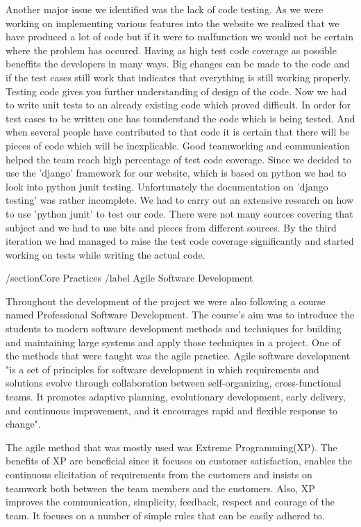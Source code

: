 \documentclass{l3proj}
\begin{document}
Another major issue we identified was the lack of code testing. As we were working on implementing various features into the website 
we realized that we have produced a lot of code but if it were to malfunction we would not be certain where the problem has occured.
Having as high test code coverage as possible beneffits the developers in many ways. Big changes can be made to the code and if 
the test cases still work that indicates that everything is still working properly. Testing code gives you further understanding of
design of the code. Now we had to write unit tests to an already existing code which proved difficult. In order for test cases to
be written one has tounderstand the code which is being tested. And when several people have contributed to that code it is certain
that there will be pieces of code which will be inexplicable. Good teamworking and communication helped the team reach high percentage
of test code coverage. Since we decided to use the 'django' framework for our website, which is based on python we had to look into 
python junit testing. Unfortunately the documentation on 'django testing' was rather incomplete. We had to carry out an extensive research
on how to use 'python junit' to test our code. There were not many sources covering that subject and we had to use bits and pieces from
different sources. By the third iteration we had managed to raise the test code coverage significantly and started working on tests
while writing the actual code. 

/section{Core Practices}
/label {Agile Software Development}

Throughout the development of the project we were also following a course named Professional Software Development.
The course's aim was to introduce the students to modern software development methods and techniques for building and
maintaining large systems and apply those techniques in a project. One of the methods that were taught
was the agile practice. Agile software development "is a set of principles for software development in
which requirements and solutions evolve through collaboration between self-organizing, cross-functional teams.
It promotes adaptive planning, evolutionary development, early delivery, and continuous improvement, and it encourages
rapid and flexible response to change".

The agile method that was mostly used was Extreme Programming(XP). The benefits of XP are beneficial since it focuses on
customer satisfaction, enables the continuous elicitation of requirements from the customers and insists on teamwork
both between the team members and the customers. Also, XP improves the communication, simplicity, feedback, respect and
courage of the team. It focuses on a number of simple rules that can be easily adhered to.
\end{document}

